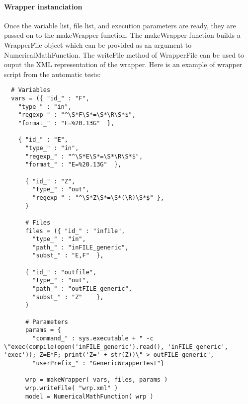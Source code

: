 \paragraph{Wrapper instanciation}

Once the variable list, file list, and execution parameters are ready, they are passed on to the makeWrapper function. The makeWrapper function builds a WrapperFile object which can be provided as an argument to NumericalMathFunction. The writeFile method of WrapperFile can be used to ouput the XML representation of the wrapper. Here is an example of wrapper script from the automatic tests:

\begin{lstlisting}
  # Variables
  vars = ({ "id_" : "F",
    "type_" : "in",
    "regexp_" : "^\S*F\S*=\S*\R\S*$",
    "format_" : "F=%20.13G"  },

    { "id_" : "E",
      "type_" : "in",
      "regexp_" : "^\S*E\S*=\S*\R\S*$",
      "format_" : "E=%20.13G"  },

      { "id_" : "Z",
        "type_" : "out",
        "regexp_" : "^\S*Z\S*=\S*(\R)\S*$" },
      )

      # Files
      files = ({ "id_" : "infile",
        "type_" : "in",
        "path_" : "inFILE_generic",
        "subst_" : "E,F"  },

      { "id_" : "outfile",
        "type_" : "out",
        "path_" : "outFILE_generic",
        "subst_" : "Z"    },
      )

      # Parameters
      params = {
        "command_" : sys.executable + " -c \"exec(compile(open('inFILE_generic').read(), 'inFILE_generic', 'exec')); Z=E*F; print('Z=' + str(Z))\" > outFILE_generic",
        "userPrefix_" : "GenericWrapperTest"}

      wrp = makeWrapper( vars, files, params )
      wrp.writeFile( "wrp.xml" )
      model = NumericalMathFunction( wrp )
\end{lstlisting}

